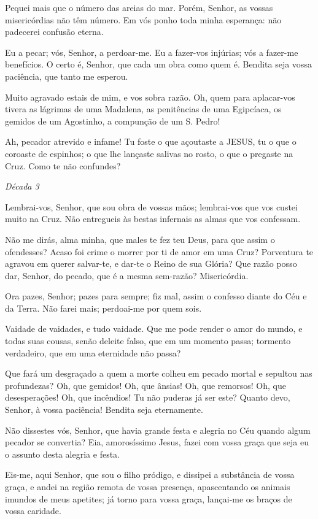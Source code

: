 Pequei mais que o número das areias do mar. Porém, Senhor, as vossas misericórdias não têm número. Em vós ponho toda minha esperança: não padecerei confusão eterna.

Eu a pecar; vós, Senhor, a perdoar-me. Eu a fazer-vos injúrias; vós a fazer-me benefícios. O certo é, Senhor, que cada um obra como quem é. Bendita seja vossa paciência, que tanto me esperou.

Muito agravado estais de mim, e vos sobra razão. Oh, quem para aplacar-vos tivera as lágrimas de uma Madalena, as penitências de uma Egipcíaca, os gemidos de um Agostinho, a compunção de um S. Pedro!

Ah, pecador atrevido e infame! Tu foste o que açoutaste a JESUS, tu o que o coroaste de espinhos; o que lhe lançaste salivas no rosto, o que o pregaste na Cruz. Como te não confundes?

\begin{nscenter} \emph{Década 3} \end{nscenter}

Lembrai-vos, Senhor, que sou obra de vossas mãos; lembrai-vos que vos custei muito na Cruz. Não entregueis às bestas infernais as almas que vos confessam.

Não me dirás, alma minha, que males te fez teu Deus, para que assim o ofendesses? Acaso foi crime o morrer por ti de amor em uma Cruz? Porventura te agravou em querer salvar-te, e dar-te o Reino de sua Glória? Que razão posso dar, Senhor, do pecado, que é a mesma sem-razão? Misericórdia.

Ora pazes, Senhor; pazes para sempre; fiz mal, assim o confesso diante do Céu e da Terra. Não farei mais; perdoai-me por quem sois.

Vaidade de vaidades, e tudo vaidade. Que me pode render o amor do mundo, e todas suas cousas, senão deleite falso, que em um momento passa; tormento verdadeiro, que em uma eternidade não passa?

Que fará um desgraçado a quem a morte colheu em pecado mortal e sepultou nas profundezas? Oh, que gemidos! Oh, que ânsias! Oh, que remorsos! Oh, que desesperações! Oh, que incêndios! Tu não puderas já ser este? Quanto devo, Senhor, à vossa paciência! Bendita seja eternamente.

Não dissestes vós, Senhor, que havia grande festa e alegria no Céu quando algum pecador se convertia? Eia, amorosíssimo Jesus, fazei com vossa graça que seja eu o assunto desta alegria e festa.

Eis-me, aqui Senhor, que sou o filho pródigo, e dissipei a substância de vossa graça, e andei na região remota de vossa presença, apascentando os animais imundos de meus apetites; já torno para vossa graça, lançai-me os braços de vossa caridade.

